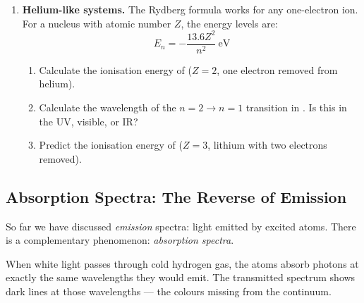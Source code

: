 \documentclass[12pt, a4paper]{book}
\newcommand{\newterm}[1]{\textit{\textcolor{DiscoveryColor}{#1}}}
\begin{document}
\begin{problembox}
\begin{enumerate}[label=\textbf{\arabic*.}]
  \item \textbf{Helium-like systems.}
        The Rydberg formula works for any one-electron ion.
        For a nucleus with atomic number $Z$, the energy levels are:
        \[
          E_n = -\frac{13.6 Z^2}{n^2}\ \text{eV}
        \]
        \begin{enumerate}[label=(\alph*)]
          \item Calculate the ionisation energy of
                 ($Z=2$, one electron removed from helium).
          \item Calculate the wavelength of the $n=2 \to n=1$
                transition in .
                Is this in the UV, visible, or IR?
          \item Predict the ionisation energy of 
                ($Z=3$, lithium with two electrons removed).
        \end{enumerate}
\end{enumerate}
\end{problembox}

\subsection{Absorption Spectra: The Reverse of Emission}

So far we have discussed \emph{emission} spectra:
light emitted by excited atoms.
There is a complementary phenomenon: \newterm{absorption spectra}.

When white light passes through cold hydrogen gas,
the atoms absorb photons at exactly the same wavelengths
they would emit.
The transmitted spectrum shows dark lines at those wavelengths ---
the colours missing from the continuum.
\end{document}

